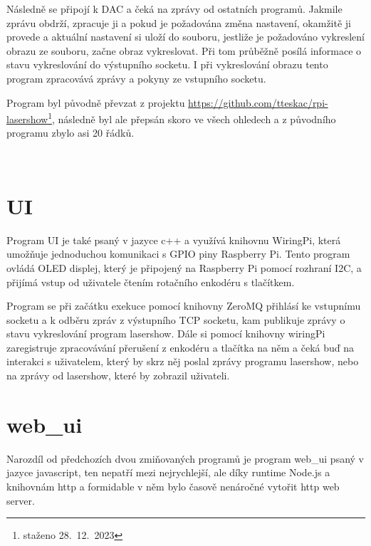 Následně se připojí k DAC a čeká na zprávy od ostatních programů. Jakmile zprávu obdrží, zpracuje ji a pokud je požadována změna nastavení, okamžitě ji provede a aktuální nastavení si uloží do souboru, jestliže je požadováno vykreslení obrazu ze souboru, začne obraz vykreslovat. Při tom průběžně posílá informace o stavu vykreslování do výstupního socketu. I při vykreslování obrazu tento program zpracovává zprávy a pokyny ze vstupního socketu.

Program byl původně převzat z projektu \url{https://github.com/tteskac/rpi-lasershow}\footnote{staženo 28.~12.~2023}, následně byl ale přepsán skoro ve všech ohledech a z původního programu zbylo asi 20 řádků.


\




\section{UI}

Program UI je také psaný v jazyce c++ a využívá knihovnu WiringPi, která umožňuje jednoduchou komunikaci s GPIO piny Raspberry Pi. Tento program ovládá OLED displej, který je připojený na Raspberry Pi pomocí rozhraní I2C, a přijímá vstup od uživatele čtením rotačního enkodéru s tlačítkem.

Program se při začátku exekuce pomocí knihovny ZeroMQ přihlásí ke vstupnímu socketu a k odběru zpráv z výstupního TCP socketu, kam publikuje zprávy o stavu vykreslování program lasershow. Dále si pomocí knihovny wiringPi zaregistruje zpracovávání přerušení z enkodéru a tlačítka na něm a čeká buď na interakci s uživatelem, který by skrz něj poslal zprávy programu lasershow, nebo na zprávy od lasershow, které by zobrazil uživateli.


\section{web\_ui}

Narozdíl od předchozích dvou zmiňovaných programů je program web\_ui psaný v jazyce javascript, ten nepatří mezi nejrychlejší, ale díky runtime Node.js a knihovnám http a formidable v něm bylo časově nenáročné vytořit http web server.

